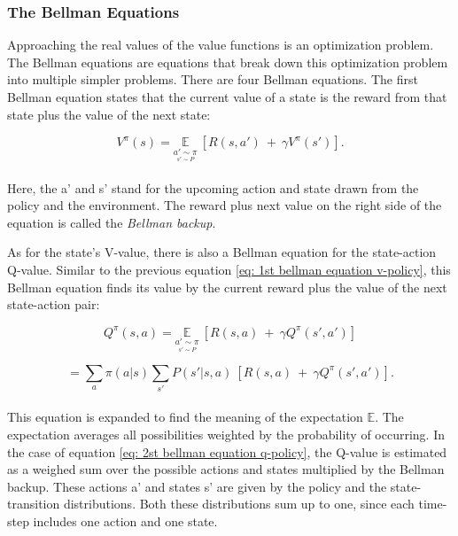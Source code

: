 \newpage

\subsubsection*{The Bellman Equations}

Approaching the real values of the value functions is an optimization problem. The Bellman equations are equations that break down this optimization problem into multiple simpler problems. There are four Bellman equations. The first Bellman equation states that the current value of a state is the reward from that state plus the value of the next state:

\begin{equation}
    \label{eq: 1st bellman equation v-policy}
    V^\pi(s) =  \underset{\underset{s' \sim P}{a' \sim \pi }}{\mathbb{E}} \ [R(s,a')\ +\ \gamma V^\pi(s')].
\end{equation}
\\
\noindent
Here, the a' and s' stand for the upcoming action and state drawn from the policy and the environment. The reward plus next value on the right side of the equation is called the \textit{Bellman backup}.

As for the state's V-value, there is also a Bellman equation for the state-action Q-value. Similar to the previous equation \ref{eq: 1st bellman equation v-policy}, this Bellman equation finds its value by the current reward plus the value of the next state-action pair:

\begin{equation}
    \label{eq: 2st bellman equation q-policy}
    Q^\pi(s,a) =  \underset{\underset{s' \sim P}{a' \sim \pi }}{\mathbb{E}} \ [R(s,a)\ +\ \gamma Q^\pi(s',a')]
\end{equation}


\begin{equation*}
    = \underset{a}{\sum}  \pi(a|s) \underset{s'}{\sum} P(s'|s,a) \ 
    [R(s,a)\ +\ \gamma Q^\pi(s',a')].
\end{equation*}
\\
\noindent
This equation is expanded to find the meaning of the expectation $\mathbb{E}$. The expectation averages all possibilities weighted by the probability of occurring. In the case of equation \ref{eq: 2st bellman equation q-policy}, the Q-value is estimated as a weighed sum over the possible actions and states multiplied by the Bellman backup. These actions a' and states s' are given by the policy and the state-transition distributions. Both these distributions sum up to one, since each time-step includes one action and one state.


